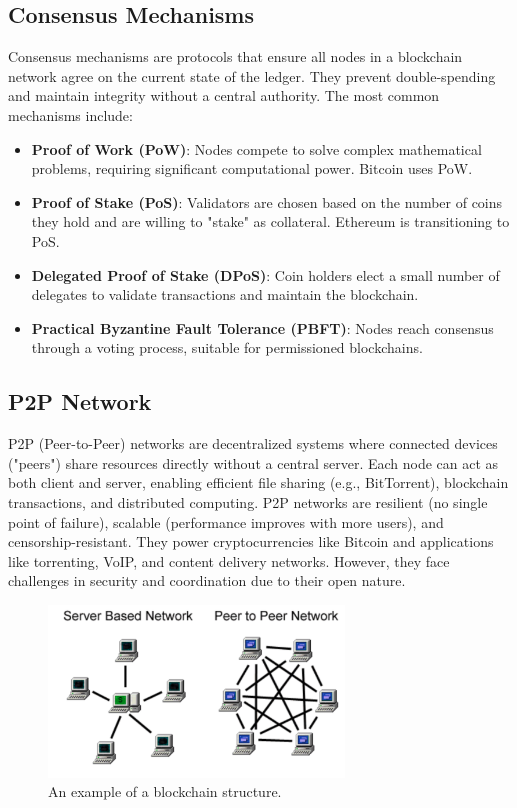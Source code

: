 \documentclass[12pt, a4paper]{article}
\begin{document}
\subsection{Consensus Mechanisms}
Consensus mechanisms are protocols that ensure all nodes in a blockchain network agree on the current state of the ledger. They prevent double-spending and maintain integrity without a central authority. The most common mechanisms include:
\begin{itemize}
    \item \textbf{Proof of Work (PoW)}: Nodes compete to solve complex mathematical problems, requiring significant computational power. Bitcoin uses PoW.
    \item \textbf{Proof of Stake (PoS)}: Validators are chosen based on the number of coins they hold and are willing to "stake" as collateral. Ethereum is transitioning to PoS.
    \item \textbf{Delegated Proof of Stake (DPoS)}: Coin holders elect a small number of delegates to validate transactions and maintain the blockchain.
    \item \textbf{Practical Byzantine Fault Tolerance (PBFT)}: Nodes reach consensus through a voting process, suitable for permissioned blockchains.
\end{itemize}
\subsection{P2P Network}
P2P (Peer-to-Peer) networks are decentralized systems where connected devices ("peers") share resources directly without a central server. Each node can act as both client and server, enabling efficient file sharing (e.g., BitTorrent), blockchain transactions, and distributed computing. P2P networks are resilient (no single point of failure), scalable (performance improves with more users), and censorship-resistant. They power cryptocurrencies like Bitcoin and applications like torrenting, VoIP, and content delivery networks. However, they face challenges in security and coordination due to their open nature.
\begin{figure}[h]
    \centering
    \includegraphics[width=0.7\textwidth]{blockchain.png}
    \caption{An example of a blockchain structure.}
    \label{fig:blockchain_structure}
\end{figure}
\end{document}
